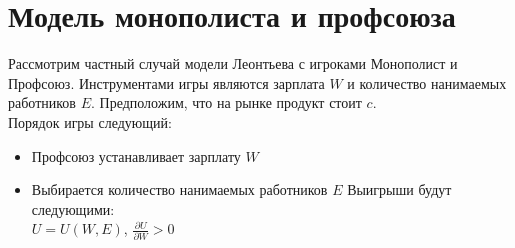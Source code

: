 \section{Модель монополиста и профсоюза}
Рассмотрим частный случай модели Леонтьева с игроками Монополист и Профсоюз.
Инструментами игры являются зарплата $W$ и количество нанимаемых работников $E$. Предположим, что на рынке продукт стоит $c$. 
\\


Порядок игры следующий:
\begin{itemize}
\item 
Профсоюз устанавливает зарплату $W$
\item
Выбирается количество нанимаемых работников $E$
Выигрыши будут следующими: 
\\
$U=U(W,E)$, $\frac{\partial{U}}{\partial{W}}>0$
\end{itemize}